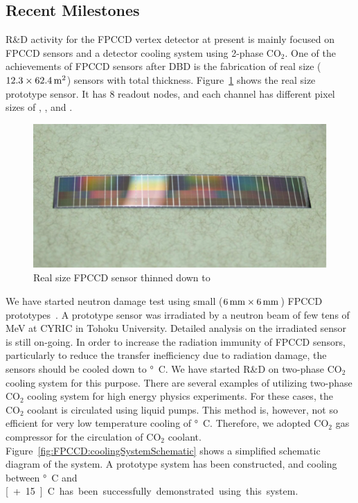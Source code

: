 \subsection{Recent Milestones}
R\&D activity for the FPCCD vertex detector at present is mainly focused on FPCCD sensors and a detector cooling system using 2-phase $\text{CO}_2$.  
One of the achievements of FPCCD sensors after DBD is the fabrication of real size ($12.3 \times \unit[62.4]{\mathrm{m}^2}$) sensors with \unit[50]{\micron} total thickness. Figure~\ref{fig:FPCCD:realSizeSensor} shows the real size prototype sensor. It has 8 readout nodes, and each channel has different pixel sizes of \unit[12]{\micron}, \unit[8]{\micron}, and \unit[6]{\micron}.
\begin{figure}
    \includegraphics[width=\textwidth]{VertexDetector/FPCCD/realSizeFPCCDSensor.png}
    \caption{Real size FPCCD sensor thinned down to \unit[50]{\micron}}
    \label{fig:FPCCD:realSizeSensor}
\end{figure}
We have started neutron damage test using small ($\unit[6]{mm}\times\unit[6]{mm}$) FPCCD prototypes~\cite{lcws:fpccd:ito:2013}. A prototype sensor was irradiated by a neutron beam of few tens of MeV at CYRIC in Tohoku University. Detailed analysis on the irradiated sensor is still on-going. 
In order to increase the radiation immunity of FPCCD sensors, particularly to reduce the transfer inefficiency due to radiation damage, the sensors should be cooled down to \unit[-40]{\degree C}. We have started R\&D on two-phase $\text{CO}_2$ cooling system for this purpose. There are several examples of utilizing two-phase $\text{CO}_2$ cooling system for high energy physics experiments. For these cases, the $\text{CO}_2$ coolant is circulated using liquid pumps. This method is, however, not so efficient for very low temperature cooling of \unit[-40]{\degree C}. Therefore, we adopted $\text{CO}_2$ gas compressor for the circulation of $\text{CO}_2$ coolant. Figure~\ref{fig:FPCCD:coolingSystemSchematic} shows a simplified schematic diagram of the system. A prototype system has been constructed, and cooling between \unit[-40]{\degree C} and \unit[+15]{\degree C} has been successfully demonstrated using this system.
